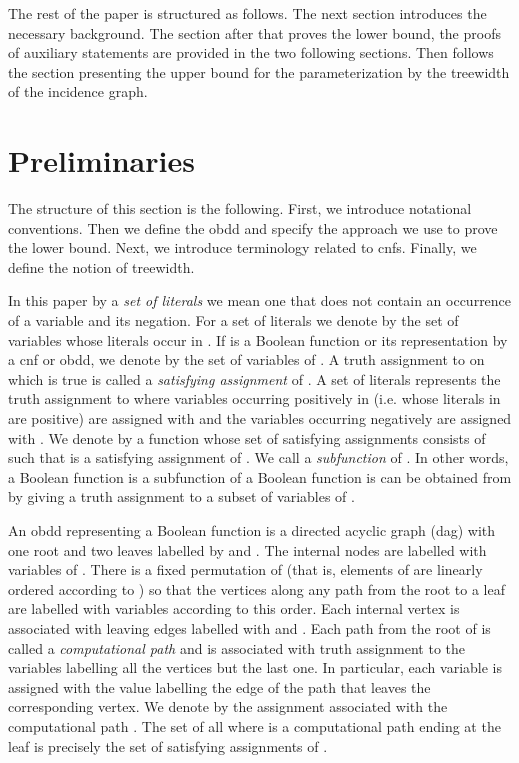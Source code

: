 \documentclass{article}
\begin{document}
The rest of the paper is structured as follows.
The next section introduces the necessary background. 
The section after that proves the lower bound, the proofs of auxiliary statements 
are provided in the two following sections. 
Then follows the section presenting the
upper bound for the parameterization
by the treewidth of the incidence graph. 



\section{Preliminaries} \label{prelim}
The structure of this section is the following. First, we introduce
notational conventions. Then we define the {\sc obdd} and specify the approach
we use to prove the lower bound. Next, we introduce terminology related
to {\sc cnf}s. Finally, we define the notion of treewidth.

In this paper by a \emph{set of literals} we mean one that does not
contain an occurrence of a variable and its negation.
For a set  of literals we denote by  the set of variables
whose literals occur in . If  is a Boolean function
or its representation by a {\sc cnf} or {\sc obdd}, we denote by 
the set of variables of . A truth assignment to  on which 
is true is called a \emph{satisfying assignment} of . A set  of literals
represents the truth assignment to  where variables occurring
positively in  (i.e. whose literals in  are positive) are assigned with 
and the variables occurring negatively are assigned with .
We denote by  a function whose set of satisfying assignments consists of 
such that  is a satisfying assignment of . We call  a \emph{subfunction}
of . In other words, a Boolean function  is a subfunction of a Boolean function
 is  can be obtained from  by giving a truth assignment to a subset of variables of .

An {\sc obdd}  representing a Boolean function  is a directed acyclic graph ({\sc dag}) with one root and two leaves
labelled by  and . 
The internal nodes are labelled with variables of . There is a fixed permutation  of 
(that is, elements of  are linearly ordered according to )
so that the vertices along any path from the root to a leaf are labelled with variables according to this order. 
Each internal vertex is associated with  leaving edges labelled with  and .
Each path  from the root of  is called a \emph{computational path} and is associated with truth assignment to
the variables labelling all the vertices but the last one. In particular, each variable is assigned with the value labelling
the edge of the path that leaves the corresponding vertex. We denote by  the assignment associated with the 
computational path . The set of all  where  is a computational path ending at the  leaf is precisely
the set of satisfying assignments of . 
\end{document}
